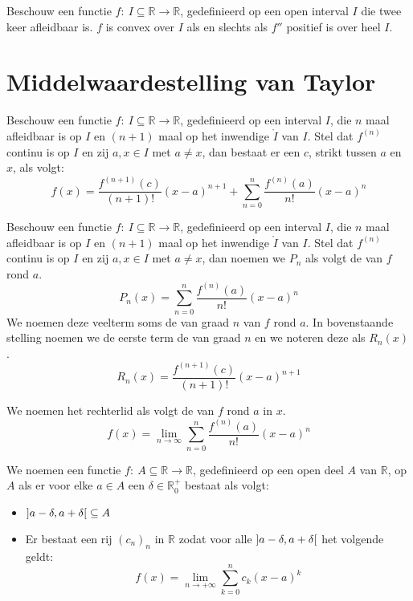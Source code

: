 \documentclass[main.tex]{subfiles}
\begin{document}
\begin{bpr}
  Beschouw een functie $f:\ I \subseteq \mathbb{R} \rightarrow \mathbb{R}$, gedefinieerd op een open interval $I$ die twee keer afleidbaar is.
  $f$ is convex over $I$ als en slechts als $f''$ positief is over heel $I$.
\end{bpr}

\section{Middelwaardestelling van Taylor}
\label{sec:midd-van-tayl}

\begin{bst}
  Beschouw een functie $f:\ I \subseteq \mathbb{R} \rightarrow \mathbb{R}$, gedefinieerd op een interval $I$, die $n$ maal afleidbaar is op $I$ en $(n+1)$ maal op het inwendige $\mathring{I}$ van $I$.
  Stel dat $f^{(n)}$ continu is op $I$ en zij $a,x\in I$ met $a \neq x$, dan bestaat er een $c$, strikt tussen $a$ en $x$, als volgt:
  \[ 
  f(x) = \frac{f^{(n+1)}(c)}{(n+1)!}(x-a)^{n+1} + \sum_{n = 0}^{n}\frac{f^{(n)}(a)}{n!}(x-a)^{n} 
  \]
\end{bst}

\begin{de}
  Beschouw een functie $f:\ I \subseteq \mathbb{R} \rightarrow \mathbb{R}$, gedefinieerd op een interval $I$, die $n$ maal afleidbaar is op $I$ en $(n+1)$ maal op het inwendige $\mathring{I}$ van $I$.
  Stel dat $f^{(n)}$ continu is op $I$ en zij $a,x\in I$ met $a \neq x$, dan noemen we $P_{n}$ als volgt de  van $f$ rond $a$.
  \[ 
  P_{n}(x) = \sum_{n = 0}^{n}\frac{f^{(n)}(a)}{n!}(x-a)^{n} 
  \]
  We noemen deze veelterm soms de  van graad $n$ van $f$ rond $a$.
  In bovenstaande stelling noemen we de eerste term de  van graad $n$ en we noteren deze als $R_{n}(x)$.
  \[ 
  R_{n}(x) = \frac{f^{(n+1)}(c)}{(n+1)!}(x-a)^{n+1} 
  \]
\end{de}

\begin{de}
  We noemen het rechterlid als volgt de  van $f$ rond $a$ in $x$.
  \[
  f(x) = \lim_{n \rightarrow \infty}\sum_{n = 0}^{n}\frac{f^{(n)}(a)}{n!}(x-a)^{n} 
  \]
\end{de}


\begin{de}
  We noemen een functie $f:\ A \subseteq \mathbb{R} \rightarrow \mathbb{R}$, gedefinieerd op een open deel $A$ van $\mathbb{R}$,  op $A$ als er voor elke $a\in A$ een $\delta \in \mathbb{R}_{0}^{+}$ bestaat als volgt:
  \begin{itemize}
  \item $\interval[open]{a-\delta}{a+\delta} \subseteq A$
  \item Er bestaat een rij $(c_{n})_{n}$ in $\mathbb{R}$ zodat voor alle $\interval[open]{a-\delta}{a+\delta}$ het volgende geldt:
    \[ f(x) = \lim_{n\rightarrow +\infty}\sum_{k=0}^{n}c_{k}(x-a)^{k} \]
  \end{itemize}
\end{de}
\end{document}
